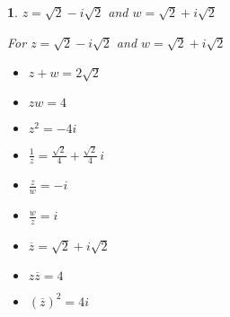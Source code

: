 \documentclass{amsbook}
\newtheorem{exc}{}
\newenvironment{ex}{\begin{exc}\normalfont}{\end{exc}}
\numberwithin{section}{chapter}
\numberwithin{equation}{chapter}
\begin{document}
\begin{ex}
	 $z = \sqrt{2} - i\sqrt{2}$ and $w = \sqrt{2} + i\sqrt{2}$

	\begin{sol}
		For  $z = \sqrt{2} - i\sqrt{2}$ and $w = \sqrt{2} + i\sqrt{2}$
		
		\begin{multicols}{3}
			
			\begin{itemize}
				
				\item $z+w = 2\sqrt{2}$
				
				\item $zw = 4$
				
				\item $z^2 = -4i$
				
			\end{itemize}
			
		\end{multicols}
		
		\begin{multicols}{3}
			
			\begin{itemize}
				
				\item $\frac{1}{z} = \frac{\sqrt{2}}{4} + \frac{\sqrt{2}}{4} \,i$
				
				\item $\frac{z}{w} = -i$
				
				\item $\frac{w}{z} = i$
				
			\end{itemize}
			
		\end{multicols}
		
		\begin{multicols}{3}
			
			\begin{itemize}
				
				\item $\overline{z} = \sqrt{2}+i\sqrt{2}$
				
				\item $z\overline{z} = 4$
				
				\item $(\overline{z})^2 = 4i$
				
			\end{itemize}
		\end{multicols}
	\end{sol}
\end{ex}
\end{document}
